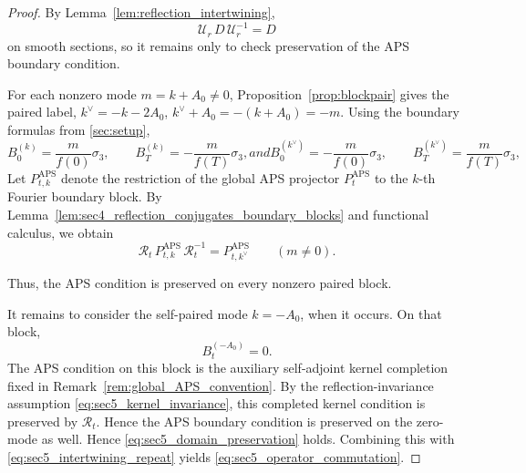 \documentclass[11pt]{article}
\theoremstyle{definition}
\DeclareMathOperator{\APS}{APS}
\numberwithin{equation}{section}
\begin{document}
\begin{proof}
By Lemma~\ref{lem:reflection_intertwining},
\begin{equation}\label{eq:sec5_intertwining_repeat}
\mathcal U_r\,D\,\mathcal U_r^{-1}=D
\end{equation}
on smooth sections, so it remains only to check preservation of the APS boundary condition.

For each nonzero mode \(m=k+A_0\neq 0\), Proposition~\ref{prop:blockpair} gives the paired label, \(k^\vee=-k-2A_0\), \(k^\vee+A_0=-(k+A_0)=-m\).
Using the boundary formulas from \autoref{sec:setup},
\begin{subequations}
\begin{equation}\label{eq:sec5_boundary_formulas_repeat}
B_0^{(k)}=\frac{m}{f(0)}\sigma_3,
\qquad
B_T^{(k)}=-\frac{m}{f(T)}\sigma_3,
\end{equation}
and
\begin{equation}\label{eq:sec5_boundary_formulas_paired}
B_0^{(k^\vee)}=-\frac{m}{f(0)}\sigma_3,
\qquad
B_T^{(k^\vee)}=\frac{m}{f(T)}\sigma_3,
\end{equation}
\end{subequations} 
Let \(P_{t,k}^{\APS}\) denote the restriction of the global APS projector \(P_t^{\APS}\) to the \(k\)-th Fourier boundary block. 
By Lemma~\ref{lem:sec4_reflection_conjugates_boundary_blocks} and functional calculus, we obtain
\begin{equation} \label{eq:sec5_projector_transport_nonzero}
\mathcal R_t\,P_{t,k}^{\APS}\,\mathcal R_t^{-1}
=
P_{t,k^\vee}^{\APS}
\qquad (m\neq 0).
\end{equation}

Thus, the APS condition is preserved on every nonzero paired block.

It remains to consider the self-paired mode \(k=-A_0\), when it occurs. On that block,
\begin{equation}\label{eq:sec5_zero_mode_boundary_operator}
B_t^{(-A_0)}=0.
\end{equation}
The APS condition on this block is the auxiliary self-adjoint kernel completion fixed in
Remark~\ref{rem:global_APS_convention}. By the reflection-invariance assumption
\eqref{eq:sec5_kernel_invariance}, this completed kernel condition is preserved by
\(\mathcal R_t\). Hence the APS boundary condition is preserved on the zero-mode as well.
Hence \eqref{eq:sec5_domain_preservation} holds. Combining this with \eqref{eq:sec5_intertwining_repeat} yields \eqref{eq:sec5_operator_commutation}.
\end{proof}
\end{document}
